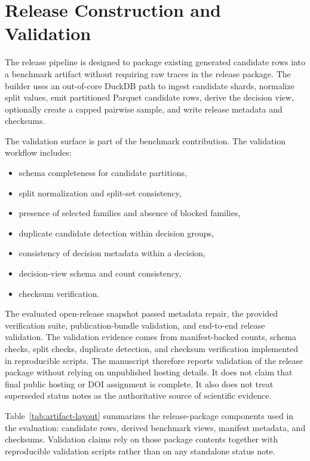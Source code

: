 \section{Release Construction and Validation}
\label{sec:release-validation}

The release pipeline is designed to package existing generated candidate rows into a benchmark artifact without requiring raw traces in the release package. The builder uses an out-of-core DuckDB path to ingest candidate shards, normalize split values, emit partitioned Parquet candidate rows, derive the decision view, optionally create a capped pairwise sample, and write release metadata and checksums.

The validation surface is part of the benchmark contribution. The validation workflow includes:
\begin{itemize}[leftmargin=*]
  \item schema completeness for candidate partitions,
  \item split normalization and split-set consistency,
  \item presence of selected families and absence of blocked families,
  \item duplicate candidate detection within decision groups,
  \item consistency of decision metadata within a decision,
  \item decision-view schema and count consistency,
  \item checksum verification.
\end{itemize}

\begin{sloppypar}
The evaluated open-release snapshot passed metadata repair, the provided verification suite, publication-bundle validation, and end-to-end release validation. The validation evidence comes from manifest-backed counts, schema checks, split checks, duplicate detection, and checksum verification implemented in reproducible scripts. The manuscript therefore reports validation of the release package without relying on unpublished hosting details. It does not claim that final public hosting or DOI assignment is complete. It also does not treat superseded status notes as the authoritative source of scientific evidence.
\end{sloppypar}

Table~\ref{tab:artifact-layout} summarizes the release-package components used in the evaluation: candidate rows, derived benchmark views, manifest metadata, and checksums. Validation claims rely on those package contents together with reproducible validation scripts rather than on any standalone status note.



